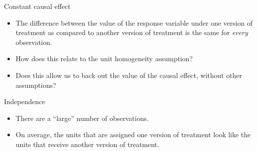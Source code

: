 \documentclass[xcolor={dvipsnames},handout]{beamer}
\begin{document}
\begin{frame}{Constant causal effect}

\begin{itemize}
\item The difference between the value of the response variable under one version of treatment as compared to another version of treatment is the same for \textit{every} observation. 
\item How does this relate to the unit homogeneity assumption? 
\item Does this allow us to back out the value of the causal effect, without other assumptions?
\end{itemize}

\end{frame}



\begin{frame}{Independence}

\begin{itemize}
\item There are a ``large'' number of observations. 
\item On average, the units that are assigned one version of treatment look like the units that receive another version of treatment. %
\end{itemize}

\end{frame}


\end{document}
